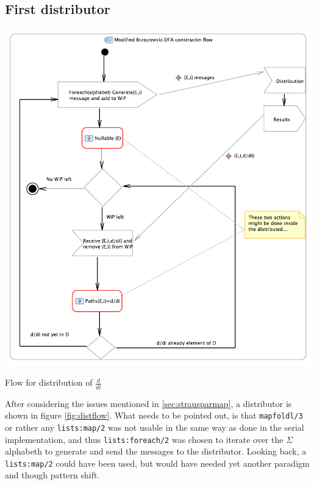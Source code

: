 \documentclass[a4paper,11pt]{report}
\begin{document}
\subsection{First distributor}

\begin{Figure}[htbp] %
	 \centering
	 \includegraphics[scale=1]{Activity.pdf} 
	 \caption{Flow for distribution of $\frac{d}{di}$}
	 \label{fig:distflow}
\end{Figure}
After considering the issues mentioned in \ref{sec:strausparmap}, a
distributor is shown in figure \ref{fig:distflow}. What needs to be
pointed out, is that \texttt{mapfoldl/3} or rather any
\texttt{lists:map/2} was not usable in the same way as done in the
serial implementation, and thus \texttt{lists:foreach/2} was chosen to
iterate over the $\Sigma$ alphabeth to generate
and send the messages to the distributor. Looking back, a
\texttt{lists:map/2} could have been used, but would have needed yet
another paradigm and though pattern shift.
\end{document}
